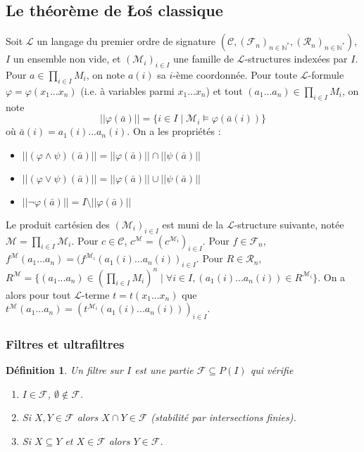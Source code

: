 \documentclass[11pt,a4paper]{article}
\newtheorem{defi}[theo]{Définition}
\newcommand{\La}{\mathcal{L}}
\newcommand{\M}{\mathcal{M}}
\newcommand{\ph}{\varphi}
\newcommand{\itemz}{\item[$\triangleright$]}
\newcommand{\F}{\mathcal{F}}
\newcommand{\N}{\mathbb{N}}
\newcommand{\R}{\mathcal{R}}
\newcommand{\C}{\mathcal{C}}
\begin{document}
\subsection{Le théorème de \L{}o\'s classique}
Soit $\La$ un langage du premier ordre de signature $(\C,(\F_n)_{n\in \N^*}, (\R_n)_{n\in \N^*})$, $I$ un ensemble non vide, et $(\M_i)_{i\in I}$ une famille de $\La$-structures indexées par $I$. Pour $a \in \prod_{i\in I} M_i$, on note $a(i)$ sa $i$-ème coordonnée. Pour toute $\La$-formule $\ph = \ph(x_1...x_n)$ (i.e. à variables parmi $x_1...x_n$) et tout $(a_1...a_n) \in \prod_{i\in I} M_i$, on note 
\[ ||\ph(\bar{a})|| = \{ i \in I \mid \M_i \models \ph(\bar{a}(i))\} \]
où $\bar{a}(i) = a_1(i)...a_n(i)$. On a les propriétés :
\begin{itemize}
\setlength\itemsep{-0.3em}
\itemz $|| (\ph \wedge \psi) (\bar{a}) || = || \ph (\bar{a}) || \cap || \psi (\bar{a}) ||$
\itemz $|| (\ph \vee \psi) (\bar{a}) || = || \ph (\bar{a}) || \cup || \psi (\bar{a}) ||$
\itemz $|| \neg\ph (\bar{a}) || = I \setminus || \ph (\bar{a}) ||$
\end{itemize}
Le produit cartésien des $(\M_i)_{i\in I}$ est muni de la $\La$-structure suivante, notée $\M = \prod_{i\in I} \M_i$. Pour $c \in \C$, $c^\M = (c^{\M_i})_{i\in I}$. Pour $f \in \F_n$, $f^\M(a_1...a_n) = (f^{\M_i}(a_1(i)...a_n(i))_{i\in I}$. Pour $R \in \R_n$, $R^\M = \{(a_1...a_n) \in (\prod_{i\in I} M_i)^n \mid \forall i \in I, (a_1(i)...a_n(i)) \in R^{\M_i}\}$. On a alors pour tout $\La$-terme $t = t(x_1...x_n)$ que $t^\M (a_1...a_n) = (t^{\M_i}(a_1(i)...a_n(i)))_{i\in I}$.
\subsubsection{Filtres et ultrafiltres}
\begin{defi}
Un filtre sur $I$ est une partie $\F \subseteq P(I)$ qui vérifie
\begin{enumerate}
\setlength\itemsep{-0.3em}
\item[(i)] $I \in \F$, $\emptyset \notin \F$.
\item[(ii)] Si $X,Y \in \F$ alors $X \cap Y \in \F$ (stabilité par intersections finies).
\item[(iii)] Si $X \subseteq Y$ et $X \in \F$ alors $Y \in \F$.
\end{enumerate}
\end{defi}
\end{document}
